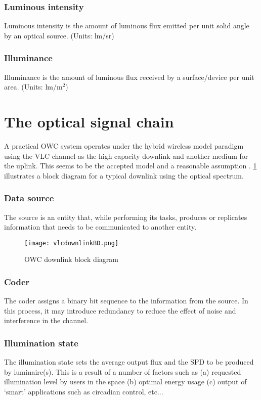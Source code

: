 \subsubsection{Luminous intensity}
\label{subsubsec:luminousIntensity}
Luminous intensity is the amount of luminous flux emitted per unit solid angle by an optical source. (Units: lm/sr)

\subsubsection{Illuminance}
\label{subsubsec:illuminance}
Illuminance is the amount of luminous flux received by a surface/device per unit area. (Units: lm/m$^{2}$)

\section{The optical signal chain}
\label{sec:outlineDownlink}

A practical OWC system operates under the hybrid wireless model paradigm using the VLC channel as the high capacity downlink and another medium for the uplink. This seems to be the accepted model and a reasonable assumption \cite{rah15a}. \figurename{ \ref{fig:VLCdownBD}} illustrates a block diagram for a typical downlink using the optical spectrum.

\subsubsection{Data source}
\label{subsubsec:outlineSource}
The source is an entity that, while performing its tasks, produces or replicates information that needs to be communicated to another entity. 

\begin{figure}[!t]
	\centering
		\texttt{[image: vlcdownlinkBD.png]}
	\caption{OWC downlink block diagram}
	\label{fig:VLCdownBD}
\end{figure}

\subsubsection{Coder}
\label{subsubsec:outlineCoder}
The coder assigns a binary bit sequence to the information from the source. In this process, it may introduce redundancy to reduce the effect of noise and interference in the channel. 

\subsubsection{Illumination state}
\label{subsubsec:outlineIllumination}
The illumination state sets the average output flux and the SPD to be produced by luminaire(s). This is a result of a number of factors such as (a) requested illumination level by users in the space (b) optimal energy usage (c) output of `smart' applications such as circadian control, etc...

